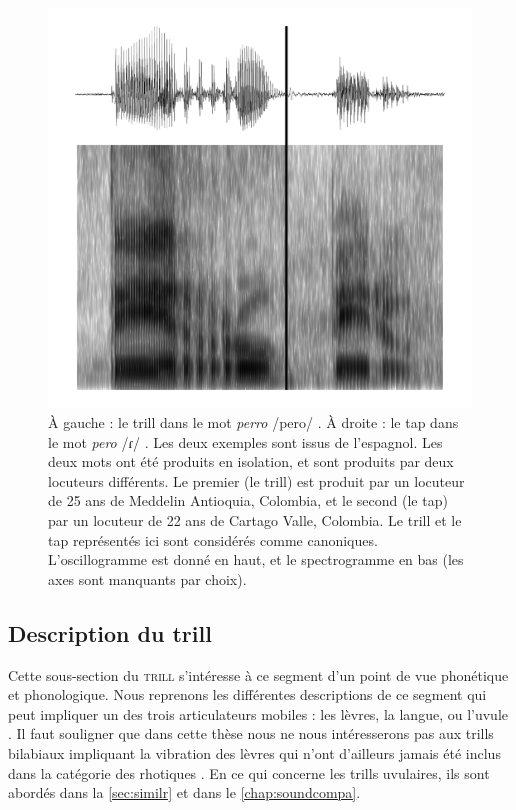 \begin{figure}
	\centering
	\includegraphics[width=1\linewidth]{rhotiques/images/praat_dogbut.pdf}
	\caption[Illustrations du /r/ et du /ɾ/ en espagnol]{À gauche : le trill dans le mot \textit{perro} /pero/ . À droite : le tap dans le mot \textit{pero} /ɾ/ . Les deux exemples sont issus de l'espagnol. Les deux mots ont été produits en isolation, et sont produits par deux locuteurs différents. Le premier (le trill) est produit par un locuteur de 25 ans de Meddelin Antioquia, Colombia, et le second (le tap) par un locuteur de 22 ans de Cartago Valle, Colombia. Le trill et le tap représentés ici sont considérés comme canoniques. L'oscillogramme est donné en haut, et le spectrogramme en bas (les axes sont manquants par choix).}
	\label{fig:praatdogbut}
\end{figure}

\subsection{Description du trill}

Cette sous-section du \textsc{trill} s'intéresse à ce segment d'un point de vue phonétique et phonologique.
Nous reprenons les différentes descriptions de ce segment qui peut impliquer un des trois articulateurs mobiles : les lèvres, la langue, ou l'uvule \parencite{ladefogedLateralsTrills1977}. Il faut souligner que dans cette thèse nous ne nous intéresserons pas aux trills bilabiaux impliquant la vibration des lèvres \parencite{rangelovBilabialTrillsAhamb2019} qui n'ont d'ailleurs jamais été inclus dans la catégorie des rhotiques \parencite{wieseRepresentationRhoticsRepresentation2011}. En ce qui concerne les trills uvulaires, ils sont abordés dans la \autoref{sec:similr} et dans le \autoref{chap:soundcompa}. \\

